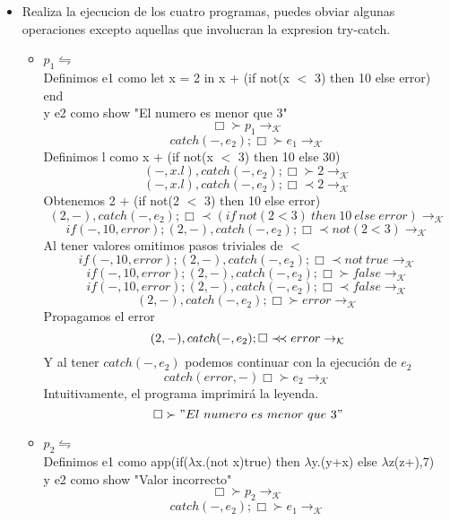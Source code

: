 \documentclass[11pt, a4paper]{report}
\newcommand{\precprec}{\prec\mathrel{\mkern-5mu}\prec}
\begin{document}
\begin{enumerate}
\begin{itemize}
\begin{itemize}
\begin{lstlisting}[mathescape=true]
	try
		app(if(($\lambda$x.(not x)true) 
			then $\lambda$y.(y+6) 
			else $\lambda$z(z+0)
			,7)
	catch error
		show "Valor incorrecto"
		 			\end{lstlisting}
		 		\end{itemize}
		 	\item Realiza la ejecucion de los cuatro programas, puedes obviar algunas operaciones excepto aquellas que involucran la expresion try-catch.
		 		\begin{itemize}
		 			\item $p_{1} \leftrightharpoons$
		 				\\Definimos e1 como let x = 2 in x + (if not(x $<$ 3) then 10 else error) end\\
		 				y e2 como show "El numero es menor que 3"
		 				$$ \Box \succ p_{1} \rightarrow_{\mathcal{K}}$$
		 				$$ catch(-,e_{2});\Box \succ e_{1} \rightarrow_{\mathcal{K}}$$
		 				Definimos l como x + (if not(x $<$ 3) then 10 else 30)
		 				$$ (-,x.l),catch(-,e_{2});\Box \succ 2 \rightarrow_{\mathcal{K}} $$
		 				$$ (-,x.l),catch(-,e_{2});\Box \prec 2 \rightarrow_{\mathcal{K}} $$
		 				Obtenemos 2 + (if not(2 $<$ 3) then 10 else error)
		 				$$ (2,-),catch(-,e_{2});\Box \prec (if\ not(2 < 3)\ then\ 10\ else\ error) \rightarrow_{\mathcal{K}}$$
		 				$$ if(-,10,error);(2,-),catch(-,e_{2});\Box \prec not(2<3) \rightarrow_{\mathcal{K}}$$
		 				Al tener valores omitimos pasos triviales de $<$
		 				$$ if(-,10,error);(2,-),catch(-,e_{2});\Box \prec not\ true \rightarrow_{\mathcal{K}}$$
		 				$$ if(-,10,error);(2,-),catch(-,e_{2});\Box \succ false \rightarrow_{\mathcal{K}}$$
		 				$$ if(-,10,error);(2,-),catch(-,e_{2});\Box \prec false \rightarrow_{\mathcal{K}} $$
		 				$$ (2,-),catch(-,e_{2});\Box \succ error \rightarrow_{\mathcal{K}}$$
		 				Propagamos el error
		 				$$ (2,-),catch(-,e_{2});\Box \precprec error \rightarrow_{\mathcal{K}} $$
		 				Y al tener $catch(-,e_{2})$ podemos continuar con la ejecución de $e_{2}$
		 				$$ catch(error,-)\Box \succ e_{2} \rightarrow_{\mathcal{K}} $$
		 				Intuitivamente, el programa imprimirá la leyenda.
		 				$$ \Box \succ "El\ numero\ es\ menor\ que\ 3" $$
		 			\item $p_{2} \leftrightharpoons$
		 				\\Definimos e1 como app(if($\lambda$x.(not x)true) then $\lambda$y.(y+x) else $\lambda$z(z+),7)\\
		 				y e2 como show "Valor incorrecto"
		 				$$ \Box \succ p_{2} \rightarrow_{\mathcal{K}}$$
		 				$$ catch(-,e_{2}); \Box \succ e_{1} \rightarrow_{\mathcal{K}}$$

\end{itemize}
\end{itemize}
\end{enumerate}
\end{document}
